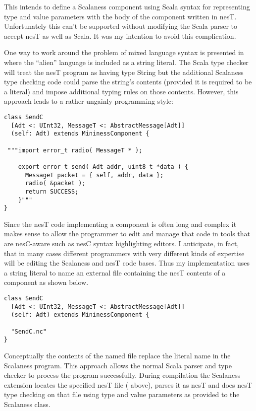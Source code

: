 This intends to define a Scalaness component using Scala syntax for representing type and value
parameters with the body of the component written in nesT. Unfortunately this can't be supported
without modifying the Scala parser to accept nesT as well as Scala. It was my intention to avoid
this complication.

One way to work around the problem of mixed language syntax is presented in
\cite{Garcia-Scala-Query} where the ``alien'' language is included as a string literal. The
Scala type checker will treat the nesT program as having type String but the additional
Scalaness type checking code could parse the string's contents (provided it is required to be a
literal) and impose additional typing rules on those contents. However, this approach leads to a
rather ungainly programming style:

\singlespace
\begin{lstlisting}[language=scalaness]
class SendC
  [Adt <: UInt32, MessageT <: AbstractMessage[Adt]]
  (self: Adt) extends MininessComponent {

 """import error_t radio( MessageT * );

    export error_t send( Adt addr, uint8_t *data ) {
      MessageT packet = { self, addr, data };
      radio( &packet );
      return SUCCESS;
    }"""
}
\end{lstlisting}
\primaryspacing

Since the nesT code implementing a component is often long and complex it makes sense to allow
the programmer to edit and manage that code in tools that are nesC-aware such as nesC syntax
highlighting editors. I anticipate, in fact, that in many cases different programmers with very
different kinds of expertise will be editing the Scalaness and nesT code bases. Thus my
implementation uses a string literal to name an external file containing the nesT contents of a
component as shown below.

\singlespace
\begin{lstlisting}[language=scalaness]
class SendC
  [Adt <: UInt32, MessageT <: AbstractMessage[Adt]]
  (self: Adt) extends MininessComponent {

  "SendC.nc"
}
\end{lstlisting}
\primaryspacing

Conceptually the contents of the named file replace the literal name in the Scalaness program.
This approach allows the normal Scala parser and type checker to process the program
successfully. During compilation the Scalaness extension locates the specified nesT file
( above), parses it as nesT and does nesT type checking on that file using
type and value parameters as provided to the Scalaness class.

